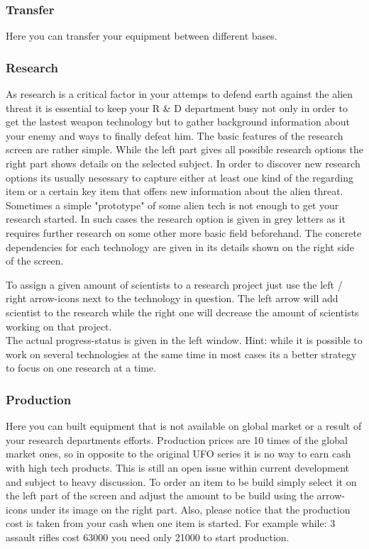 \subsubsection{Transfer}
Here you can transfer your equipment between different bases.

\subsubsection{Research}
As research is a critical factor in your attemps to defend earth against the alien threat it is essential to keep your R & D department busy not only in order to get the lastest weapon technology but to gather background information about your enemy and ways to finally defeat him. The basic features of the research screen are rather simple. While the left part gives all possible research options the right part shows details on the selected subject. In order to discover new research options its usually nesessary to capture either at least one kind of the regarding item or a certain key item that offers new information about the alien threat. Sometimes a simple "prototype" of some alien tech is not enough to get your research started. In such cases the research option is given in grey letters as it requires further research on some other more basic field beforehand. The concrete dependencies for each technology are given in its details shown on the right side of the screen.

To assign a given amount of scientists to a research project just use the left / right arrow-icons next to the technology in question. The left arrow will add scientist to the research while the right one will decrease the amount of scientists working on that project.\\
The actual progress-status is given in the left window. Hint: while it is possible to work on several technologies at the same time in most cases its a better strategy to focus on one research at a time.

\subsubsection{Production}
Here you can built equipment that is not available on global market or a result of your research departments efforts. Production prices are 10 times of the global market ones, so in opposite to the original UFO series it is no way to earn cash with high tech products. This is still an open issue within current development and subject to heavy discussion. To order an item to be build simply select it on the left part of the screen and adjust the amount to be build using the arrow-icons under its image on the right part. Also, please notice that the production cost is taken from your cash when one item is started. For example while: 3 assault rifles cost 63000 you need only 21000 to start production.

